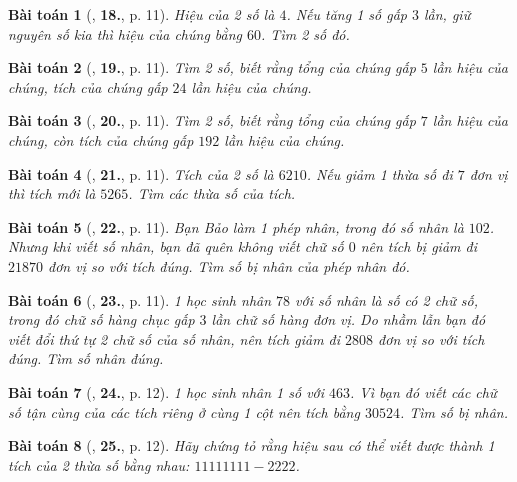 \documentclass{article}
\numberwithin{equation}{section}
\newtheorem{baitoan}{Bài toán}[section]
\begin{document}
\begin{baitoan}[\cite{Binh_Toan_6_tap_1}, \textbf{18.}, p. 11]
	Hiệu của 2 số là $4$. Nếu tăng 1 số gấp $3$ lần, giữ nguyên số kia thì hiệu của chúng bằng $60$. Tìm 2 số đó.
\end{baitoan}

\begin{baitoan}[\cite{Binh_Toan_6_tap_1}, \textbf{19.}, p. 11]
	Tìm 2 số, biết rằng tổng của chúng gấp $5$ lần hiệu của chúng, tích của chúng gấp $24$ lần hiệu của chúng.
\end{baitoan}

\begin{baitoan}[\cite{Binh_Toan_6_tap_1}, \textbf{20.}, p. 11]
	Tìm 2 số, biết rằng tổng của chúng gấp $7$ lần hiệu của chúng, còn tích của chúng gấp $192$ lần hiệu của chúng.
\end{baitoan}

\begin{baitoan}[\cite{Binh_Toan_6_tap_1}, \textbf{21.}, p. 11]
	Tích của 2 số là $6210$. Nếu giảm 1 thừa số đi $7$ đơn vị thì tích mới là $5265$. Tìm các thừa số của tích.
\end{baitoan}

\begin{baitoan}[\cite{Binh_Toan_6_tap_1}, \textbf{22.}, p. 11]
	Bạn Bảo làm 1 phép nhân, trong đó số nhân là $102$. Nhưng khi viết số nhân, bạn đã quên không viết chữ số $0$ nên tích bị giảm đi $21870$ đơn vị so với tích đúng. Tìm số bị nhân của phép nhân đó.
\end{baitoan}

\begin{baitoan}[\cite{Binh_Toan_6_tap_1}, \textbf{23.}, p. 11]
	1 học sinh nhân $78$ với số nhân là số có 2 chữ số, trong đó chữ số hàng chục gấp $3$ lần chữ số hàng đơn vị. Do nhầm lẫn bạn đó viết đổi thứ tự 2 chữ số của số nhân, nên tích giảm đi $2808$ đơn vị so với tích đúng. Tìm số nhân đúng.
\end{baitoan}

\begin{baitoan}[\cite{Binh_Toan_6_tap_1}, \textbf{24.}, p. 12]
	1 học sinh nhân 1 số với $463$. Vì bạn đó viết các chữ số tận cùng của các tích riêng ở cùng 1 cột nên tích bằng $30524$. Tìm số bị nhân.
\end{baitoan}

\begin{baitoan}[\cite{Binh_Toan_6_tap_1}, \textbf{25.}, p. 12]
	Hãy chứng tỏ rằng hiệu sau có thể viết được thành 1 tích của 2 thừa số bằng nhau: $11111111 - 2222$.
\end{baitoan}
\end{document}
